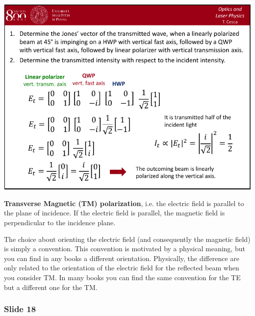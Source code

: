 \documentclass[../main/main.tex]{subfiles}
\begin{document}
\begin{minipage}[]{0.5\linewidth}
\centering
\includegraphics[page=17,width=1\textwidth]{../lessons/pdf_file/04_lecture.pdf}
\end{minipage}
\hspace{0.3cm}\vspace{0.3cm}
\begin{minipage}[c]{0.47\linewidth}

\textbf{Transverse Magnetic (TM) polarization}, i.e. the electric field is parallel to the plane of incidence. If the electric field is parallel, the magnetic field is perpendicular to the incidence plane.

The choice about orienting the electric field (and consequently the magnetic field) is simply a convention. This convention is motivated by a physical meaning, but you can find in any books a different orientation. Physically, the difference are only related to the orientation of the electric field for the reflected beam when you consider TM. In many books you can find the same convention for the TE but a different one for the TM.

\end{minipage}

\subsubsection*{Slide 18}
\end{document}
